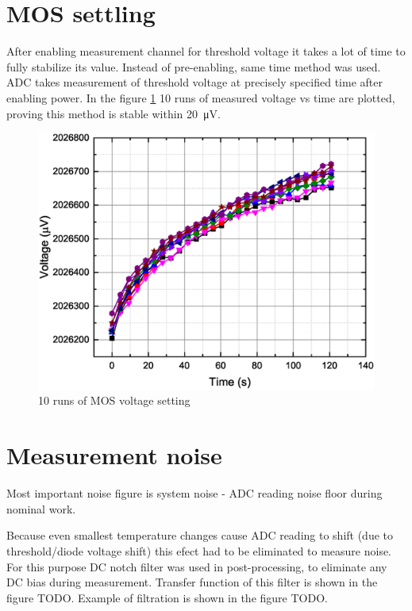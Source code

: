 \section{MOS settling}
    After enabling measurement channel for threshold voltage it takes a lot of time to fully stabilize its value. Instead of pre-enabling, same time method was used. ADC takes measurement of threshold voltage at precisely specified time after enabling power. In the figure \ref{MOS_settling} 10 runs of measured voltage vs time are plotted, proving this method is stable within \SI{20}{\uV}.

    \begin{figure}[H]
        \centering
        \includegraphics[width=0.8\paperwidth]{img/07/MOS_settling.eps}
        \caption{10 runs of MOS voltage setting}
        \label{MOS_settling}
    \end{figure}

\section{Measurement noise}
    Most important noise figure is system noise - ADC reading noise floor during nominal work.

    Because even smallest temperature changes cause ADC reading to shift (due to threshold/diode voltage shift) this efect had to be eliminated to measure noise. For this purpose DC notch filter was used in post-processing, to eliminate any DC bias during measurement. Transfer function of this filter is shown in the figure TODO. Example of filtration is shown in the figure TODO.

